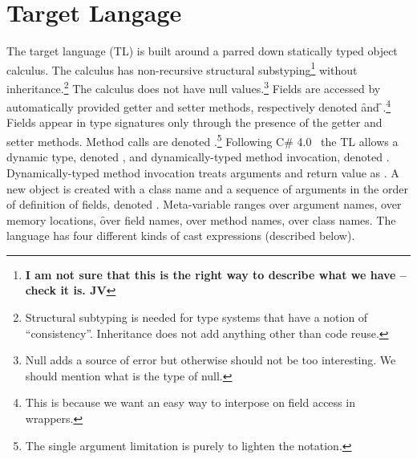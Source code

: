 \documentclass[a4paper,UKenglish,final]{lipics}
\begin{document}
\section*{Target Langage}

The target language (TL) is built around a parred down statically typed
object calculus. The calculus has non-recursive structural
substyping\footnote{\bf I am not sure that this is the right way to describe
  what we have -- check it is. JV} without inheritance.\footnote{Structural
  subtyping is needed for type systems that have a notion of
  ``consistency''. Inheritance does not add anything other than code reuse.}
The calculus does not have null values.\footnote{Null adds a source of error
  but otherwise should not be too interesting. We should mention what is the
  type of null.} Fields are accessed by automatically provided getter and
setter methods, respectively denoted \Get\x\f and \Set\x\f\e.\footnote{This
  is because we want an easy way to interpose on field access in wrappers.}
Fields appear in type signatures only through the presence of the getter and
setter methods. Method calls are denoted \Call\x\m\e.\footnote{The single
  argument limitation is purely to lighten the notation.} Following C\#
4.0~\cite{} the TL allows a dynamic type, denoted \any, and
dynamically-typed method invocation, denoted
\DynCall\x\m\e. Dynamically-typed method invocation treats arguments and
return value as \any. A new object is created with a class name and a
sequence of arguments in the order of definition of fields, denoted
\New\C{\b\e}.  Meta-variable \x ranges over argument names, \a over memory
locations, \f over field names, \m over method names, \C over class
names. The language has four different kinds of cast expressions (described
below).
\end{document}
